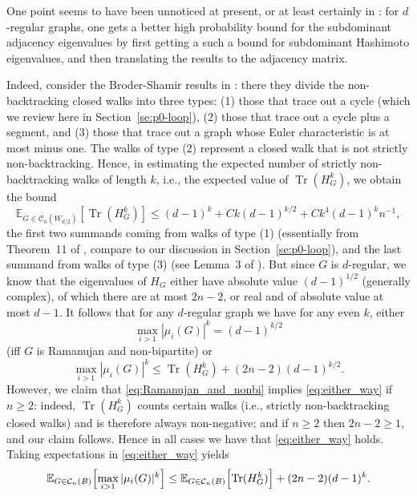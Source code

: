 \documentclass{memo-l}
\theoremstyle{plain}
\theoremstyle{definition}
\numberwithin{section}{chapter}
\numberwithin{equation}{chapter}
\DeclareMathOperator{\Tr}{Tr}
\theoremstyle{plain}
\theoremstyle{definition}
\newcommand\EE{\mathbb{E}}
\newcommand\cC{\mathcal{C}}
\begin{document}
One point seems to have been unnoticed at present, or at least certainly
in \cite{broder,friedman_random_graphs}: for $d$-regular graphs, one
gets a better high probability bound for the subdominant
adjacency eigenvalues by
first getting a such a bound for subdominant Hashimoto eigenvalues,
and then translating the results to the adjacency matrix.

Indeed, consider the Broder-Shamir results in \cite{broder}: there
they divide the non-backtracking closed walks into three types:
(1) those that trace out a cycle (which we review here in 
Section~\ref{se:p0-loop}), (2) those that trace out a cycle plus a
segment, and (3) those that trace out a graph whose Euler characteristic
is at most minus one.
The walks of type (2) represent a closed walk that is
not strictly non-backtracking.  Hence, in estimating the expected
number of strictly non-backtracking walks of length $k$, i.e.,
the expected value of $\Tr(H_G^k)$, we obtain the bound 
\begin{equation}\label{eq:broder_shamir_strict}
\EE_{G \in \cC_n(W_{d/2})}[ \Tr(H_G^k) ] \le (d-1)^k +
C k (d-1)^{k/2}+ Ck^4 (d-1)^k n^{-1} ,
\end{equation}
the first two summands coming from walks of type (1) (essentially
from Theorem~11 of \cite{broder}, compare to our discussion in
Section~\ref{se:p0-loop}), and the last summand from walks of
type (3) (see Lemma~3 of \cite{broder}).
But since $G$ is $d$-regular, we know that the eigenvalues
of $H_G$ either have absolute value $(d-1)^{1/2}$ (generally complex),
of which there are at most $2n-2$, 
or real and of absolute value at most $d-1$.  
It follows that for any $d$-regular graph we have for any even $k$, either
\begin{equation}\label{eq:Ramanujan_and_nonbi}
\max_{i>1} |\mu_i(G)|^k = (d-1)^{k/2}
\end{equation}
(iff $G$ is Ramanujan and non-bipartite) or
\begin{equation}\label{eq:either_way}
\max_{i>1} |\mu_i(G)|^k \le \Tr(H_G^k) + (2n-2)(d-1)^{k/2}.
\end{equation}
However, we claim that \eqref{eq:Ramanujan_and_nonbi} implies 
\eqref{eq:either_way} if $n\ge 2$: indeed, $\Tr(H_G^k)$ counts certain
walks (i.e., strictly non-backtracking closed walks) and is therefore
always non-negative; and if $n\ge 2$
then $2n-2\ge 1$, and our claim follows.
Hence in all cases we have that
\eqref{eq:either_way} holds.  Taking expectations in \eqref{eq:either_way}
yields
$$
\EE_{G\in \cC_n(B)}\Bigl[\max_{i>1} |\mu_i(G)|^k \Bigr] \le 
\EE_{G\in \cC_n(B)}\Bigl[ \Tr(H_G^k) \Bigr] + (2n-2)(d-1)^k.
$$
\end{document}
